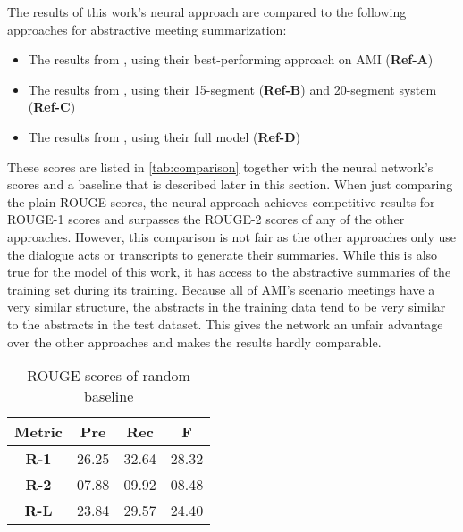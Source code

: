 The results of this work's neural approach are compared to the following approaches for abstractive meeting summarization:
\begin{itemize}
\item The results from \cite{shang-etal-2018-unsupervised}, using their best-performing approach on AMI (\textbf{Ref-A})
\item The results from \cite{oya-etal-2014-template}, using their 15-segment (\textbf{Ref-B}) and 20-segment system (\textbf{Ref-C})
\item The results from \cite{mehdad-etal-2013-abstractive}, using their full model (\textbf{Ref-D})
\end{itemize}

These scores are listed in \cref{tab:comparison} together with the neural network's scores and a baseline that is described later in this section.
When just comparing the plain ROUGE scores, the neural approach achieves competitive results for ROUGE-1 scores and surpasses the ROUGE-2 scores of any of the other approaches.
However, this comparison is not fair as the other approaches only use the dialogue acts or transcripts to generate their summaries.
While this is also true for the model of this work, it has access to the abstractive summaries of the training set during its training.
Because all of AMI's scenario meetings have a very similar structure, the abstracts in the training data tend to be very similar to the abstracts in the test dataset.
This gives the network an unfair advantage over the other approaches and makes the results hardly comparable.

\begin{table}[h]
\centering
\begin{tabular}{@{}clll@{}}
\toprule
\textbf{Metric} & \multicolumn{1}{c}{\textbf{Pre}} & \multicolumn{1}{c}{\textbf{Rec}} & \multicolumn{1}{c}{\textbf{F}} \\ \midrule
\textbf{R-1}    & 26.25                           & 32.64                           & 28.32                         \\
\textbf{R-2}    & 07.88                           & 09.92                           & 08.48                         \\
\textbf{R-L}    & 23.84                           & 29.57                           & 24.40                         \\ \bottomrule
\end{tabular}
\caption{ROUGE scores of random baseline}
\label{tab:extended-experiment-rouge-random}
\end{table}

